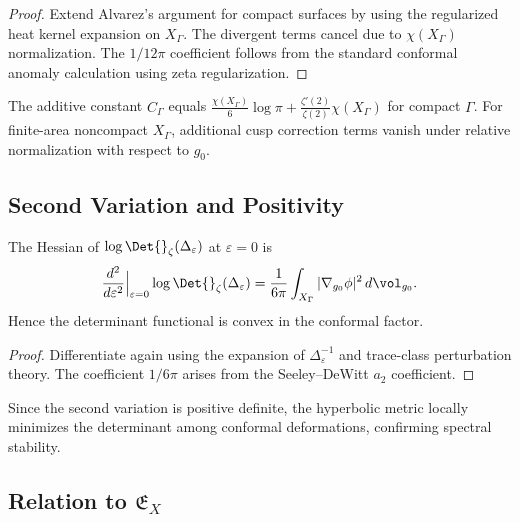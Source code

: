 \begin{proof}\relax
Extend Alvarez's argument for compact surfaces by using the regularized heat kernel expansion on $X_\Gamma$. The divergent terms cancel due to $\chi(X_\Gamma)$ normalization. The $1/12\pi$ coefficient follows from the standard conformal anomaly calculation using zeta regularization. %
\end{proof}

\begin{remark}\label{rem:top-term}\relax
The additive constant $C_\Gamma$ equals $\frac{\chi(X_\Gamma)}{6}\log\pi + \frac{\zeta'(2)}{\zeta(2)}\chi(X_\Gamma)$ for compact $\Gamma$.  
For finite-area noncompact $X_\Gamma$, additional cusp correction terms vanish under relative normalization with respect to $g_0$. %
\end{remark}

\subsection{Second Variation and Positivity}\relax\hspace{0pt}
\label{subsec:second-var}\relax\hspace{0pt}

\begin{lemma}\label{lem:second-var}\relax
The Hessian of $\log\Det{}_\zeta(\Delta_\varepsilon)$ at $\varepsilon=0$ is
\[
\frac{d^2}{d\varepsilon^2}\Big|_{\varepsilon=0}\log\Det{}_\zeta(\Delta_\varepsilon)
=\frac{1}{6\pi}\int_{X_\Gamma} |\nabla_{g_0}\phi|^2\,d\vol_{g_0}.
\]
Hence the determinant functional is convex in the conformal factor. %
\end{lemma}

\begin{proof}\relax
Differentiate  again using the expansion of $\Delta_\varepsilon^{-1}$ and trace-class perturbation theory. The coefficient $1/6\pi$ arises from the Seeley–DeWitt $a_2$ coefficient. %
\end{proof}

\begin{remark}\label{rem:stability}\relax
Since the second variation is positive definite, the hyperbolic metric locally minimizes the determinant among conformal deformations, confirming spectral stability. %
\end{remark}

\subsection{Relation to $\mathfrak{E}_X$}\relax\hspace{0pt}
\label{subsec:relation-to-E}\relax\hspace{0pt}

